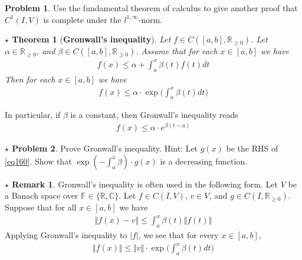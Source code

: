 \documentclass[12pt,b5paper,notitlepage]{article}
\theoremstyle{definition}
\newtheorem{srem}[df]{$\star$ Remark}
\newtheorem{prob}{\color{red}Problem}[section]
\newtheorem{sprob}[prob]{\color{red}$\star$ Problem}
\theoremstyle{plain}
\newtheorem{sthm}[df]{$\star$ Theorem}
\newcommand{\fk}{\mathfrak}
\newcommand{\Cbb}{\mathbb C}
\newcommand{\Rbb}{\mathbb R}
\newcommand{\Fbb}{\mathbb F}
\numberwithin{equation}{section}
\begin{document}
\begin{comment}
\begin{proof}[Hint]
To find $\int_0^1f$, for each $y\in\Rbb$, define $\varphi_y:V\rightarrow\Rbb$ by $\varphi_y(f)=f(y)$. Then $\varphi_y\in\fk L(V,\Rbb)$. Use $\varphi_y(\int_0^1f)=\int_0^1\varphi_y(f)$ to calculate $\int_0^1f$.
\end{proof}
\end{comment}



\begin{prob}
Use the fundamental theorem of calculus to give another proof that $C^1(I,V)$ is complete under the $l^{1,\infty}$-norm.
\end{prob}





\begin{sthm}[\textbf{Gronwall's inequality}] 
Let $f\in C([a,b],\Rbb_{\geq0})$. Let $\alpha\in\Rbb_{\geq0}$, and $\beta\in C([a,b],\Rbb_{\geq0})$. Assume that for each $x\in[a,b]$ we have
\begin{align}
f(x)\leq  \alpha+\int_a^x\beta(t)f(t) dt  \label{eq160}
\end{align}
Then for each $x\in[a,b]$ we have
\begin{align}
f(x)\leq \alpha\cdot  \exp\Big(\int_a^x \beta(t)dt \Big)
\end{align}
\end{sthm}
In particular, if $\beta$ is a constant, then Gronwall's inequality reads
\begin{align*}
f(x)\leq\alpha\cdot e^{\beta (t-a)}
\end{align*}

\begin{sprob}
Prove Gronwall's inequality. Hint: Let $g(x)$ be the RHS of \eqref{eq160}. Show that $\exp(-\int_a^x\beta)\cdot g(x)$ is a decreasing function.
\end{sprob}

\begin{srem}
Gronwall's inequality is often used in the following form. Let $V$ be a Banach space over $\Fbb\in\{\Rbb,\Cbb\}$. Let $f\in C(I,V)$, $v\in V$, and $g\in C(I,\Rbb_{\geq0})$. Suppose that for all $x\in[a,b]$ we have
\begin{align}
\Vert f(x)-v\Vert\leq\int_a^x\beta(t)\Vert f(t)\Vert
\end{align}
Applying Gronwall's inequality to $|f|$, we see that for every $x\in[a,b]$,
\begin{align}
\Vert f(x)\Vert\leq \Vert v\Vert\cdot  \exp\Big(\int_a^x \beta(t)dt \Big)
\end{align}
\end{srem}
\end{document}
